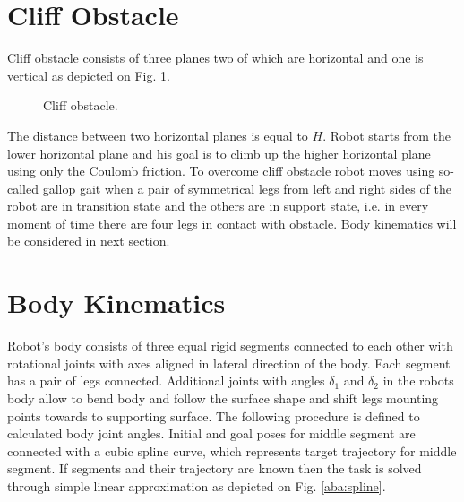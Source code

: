 \documentclass{ws-procs9x6}
\begin{document}
\section{Cliff Obstacle}
Cliff obstacle consists of three planes two of which are horizontal and one is vertical as depicted on Fig. \ref{aba:cliff}.


\begin{figure}
  \begin{center}
  \end{center}
  \caption{Cliff obstacle.}
  \label{aba:cliff}
\end{figure}

The distance between two horizontal planes is equal to $H$. Robot starts from the lower horizontal plane and his goal is to climb up the higher horizontal plane using only the Coulomb friction.
To overcome cliff obstacle robot moves using so-called gallop gait when a pair of symmetrical legs from left and right sides of the robot are in transition state and the others are in support state, i.e. in every moment of time there are four legs in contact with obstacle. Body kinematics will be considered in next section.


\section{Body Kinematics}
Robot’s body consists of three equal rigid segments connected to each other with rotational joints with axes aligned in lateral direction of the body. Each segment has a pair of legs connected. Additional joints with angles $\delta_1$ and $\delta_2$ in the robots body allow to bend body and follow the surface shape and shift legs mounting points towards to supporting surface. 
The following procedure is defined to calculated body joint angles. Initial and goal poses for middle segment are connected with a cubic spline curve, which represents target trajectory for middle segment. If segments and their trajectory are known then the task is solved through simple linear approximation as depicted on Fig. \ref{aba:spline}.
\end{document}
